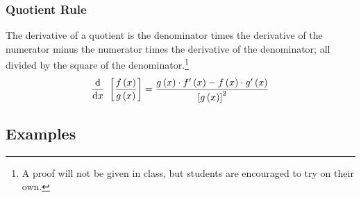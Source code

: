 \documentclass[12pt,addpoints, answers, fleqn]{exam}
\begin{document}
\subsubsection{Quotient Rule}
The derivative of a quotient is the denominator times the derivative of the numerator minus the numerator times the derivative of the denominator; all divided by the square of the denominator.\footnote{A proof will not be given in class, but students are encouraged to try on their own.}
\[
\frac{{\rm{d}}}{{\rm{d}}x} \ \left[ \frac{f\left( x \right)}{g\left( x \right)} \right]  = \frac{g\left( x \right) \cdot f'\left( x \right) - f\left( x \right) \cdot g'\left( x \right)}{\left[ g\left( x \right)\right]^2} \]

\subsection{Examples}
\end{document}
